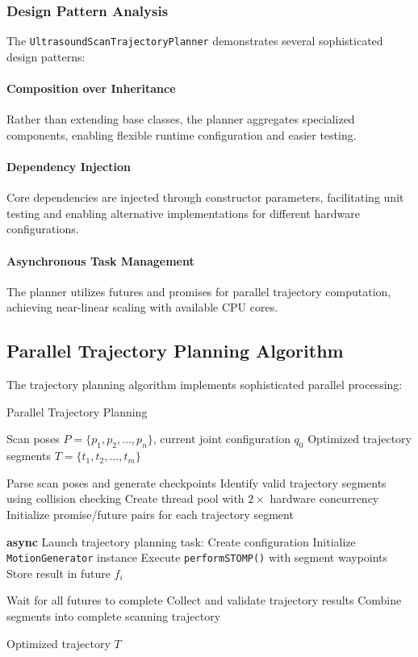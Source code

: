 \subsubsection{Design Pattern Analysis}

The \texttt{UltrasoundScanTrajectoryPlanner} demonstrates several sophisticated design patterns:

\paragraph{Composition over Inheritance}
Rather than extending base classes, the planner aggregates specialized components, enabling flexible runtime configuration and easier testing.

\paragraph{Dependency Injection}
Core dependencies are injected through constructor parameters, facilitating unit testing and enabling alternative implementations for different hardware configurations.

\paragraph{Asynchronous Task Management}
The planner utilizes futures and promises for parallel trajectory computation, achieving near-linear scaling with available CPU cores.

\subsection{Parallel Trajectory Planning Algorithm}

The trajectory planning algorithm implements sophisticated parallel processing:

\begin{algorithm}[H]
\caption{Parallel Trajectory Planning}
\label{alg:parallel_planning}
\begin{algorithmic}[1]
\REQUIRE Scan poses $P = \{p_1, p_2, \ldots, p_n\}$, current joint configuration $q_0$
\ENSURE Optimized trajectory segments $T = \{t_1, t_2, \ldots, t_m\}$

\STATE Parse scan poses and generate checkpoints
\STATE Identify valid trajectory segments using collision checking
\STATE Create thread pool with $2 \times$ hardware concurrency
\STATE Initialize promise/future pairs for each trajectory segment

    \STATE \textbf{async} Launch trajectory planning task:
    \STATE \quad Create \stomp{} configuration
    \STATE \quad Initialize \texttt{MotionGenerator} instance
    \STATE \quad Execute \texttt{performSTOMP()} with segment waypoints
    \STATE \quad Store result in future $f_i$
\ENDFOR

\STATE Wait for all futures to complete
\STATE Collect and validate trajectory results
\STATE Combine segments into complete scanning trajectory

\RETURN Optimized trajectory $T$
\end{algorithmic}
\end{algorithm}

